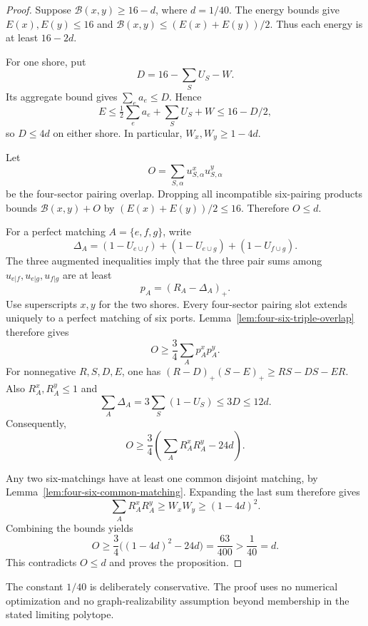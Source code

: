\begin{proof}
Suppose $\mathcal B(x,y)\ge16-d$, where $d=1/40$.
The energy bounds give $E(x),E(y)\le16$ and
$\mathcal B(x,y)\le(E(x)+E(y))/2$.
Thus each energy is at least $16-2d$.

For one shore, put
\[
 D=16-\sum_SU_S-W.
\]
Its aggregate bound gives $\sum_ea_e\le D$.
Hence
\[
 E\le\tfrac12\sum_ea_e+\sum_SU_S+W
 \le16-D/2,
\]
so $D\le4d$ on either shore.
In particular, $W_x,W_y\ge1-4d$.

Let
\[
 O=\sum_{S,\alpha}u^x_{S,\alpha}u^y_{S,\alpha}
\]
be the four-sector pairing overlap.
Dropping all incompatible six-pairing products bounds
$\mathcal B(x,y)+O$ by $(E(x)+E(y))/2\le16$.
Therefore $O\le d$.

For a perfect matching $A=\{e,f,g\}$, write
\[
 \Delta_A=(1-U_{e\cup f})+(1-U_{e\cup g})+(1-U_{f\cup g}).
\]
The three augmented inequalities imply that the three pair sums among
$u_{e|f},u_{e|g},u_{f|g}$ are at least
\[
 p_A=(R_A-\Delta_A)_+.
\]
Use superscripts $x,y$ for the two shores.
Every four-sector pairing slot extends uniquely to a perfect matching of six ports.
Lemma~\ref{lem:four-six-triple-overlap} therefore gives
\[
 O\ge\frac34\sum_A p_A^x p_A^y.
\]
For nonnegative $R,S,D,E$, one has
$(R-D)_+(S-E)_+\ge RS-DS-ER$.
Also $R_A^x,R_A^y\le1$ and
\[
 \sum_A\Delta_A=3\sum_S(1-U_S)\le3D\le12d.
\]
Consequently,
\[
 O\ge\frac34\left(\sum_A R_A^xR_A^y-24d\right).
\]

Any two six-matchings have at least one common disjoint matching, by Lemma~\ref{lem:four-six-common-matching}.
Expanding the last sum therefore gives
\[
 \sum_A R_A^xR_A^y\ge W_xW_y\ge(1-4d)^2.
\]
Combining the bounds yields
\[
 O\ge\frac34\bigl((1-4d)^2-24d\bigr)
 =\frac{63}{400}>\frac1{40}=d.
\]
This contradicts $O\le d$ and proves the proposition.
\end{proof}

The constant $1/40$ is deliberately conservative.
The proof uses no numerical optimization and no graph-realizability assumption beyond membership in the stated limiting polytope.

